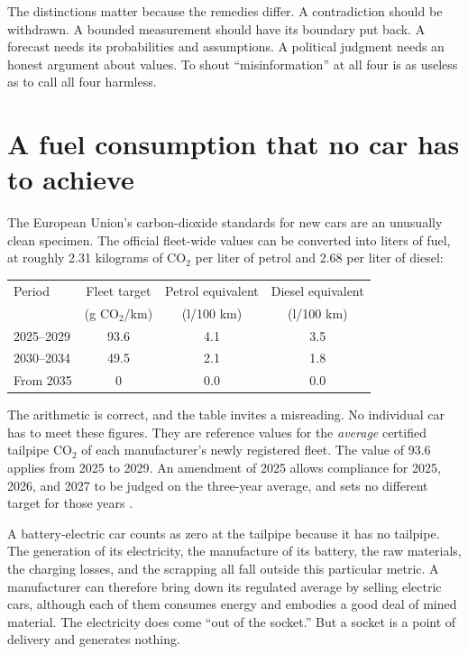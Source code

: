 \documentclass[12pt,a4paper]{book}
\begin{document}
The distinctions matter because the remedies differ. A contradiction should be withdrawn. A bounded measurement should have its boundary put back. A forecast needs its probabilities and assumptions. A political judgment needs an honest argument about values. To shout ``misinformation'' at all four is as useless as to call all four harmless.

\section{A fuel consumption that no car has to achieve}

The European Union's carbon-dioxide standards for new cars are an unusually clean specimen. The official fleet-wide values can be converted into liters of fuel, at roughly 2.31 kilograms of CO$_2$ per liter of petrol and 2.68 per liter of diesel:

\begin{center}
\begin{tabular}{lccc}
\hline
Period & Fleet target & Petrol equivalent & Diesel equivalent \\
       & (g CO$_2$/km) & (l/100 km) & (l/100 km) \\
\hline
2025--2029 & 93.6 & 4.1 & 3.5 \\
2030--2034 & 49.5 & 2.1 & 1.8 \\
From 2035 & 0 & 0.0 & 0.0 \\
\hline
\end{tabular}
\end{center}

The arithmetic is correct, and the table invites a misreading. No individual car has to meet these figures. They are reference values for the \emph{average} certified tailpipe CO$_2$ of each manufacturer's newly registered fleet. The value of 93.6 applies from 2025 to 2029. An amendment of 2025 allows compliance for 2025, 2026, and 2027 to be judged on the three-year average, and sets no different target for those years \cite{EUCarCO2Standards,EUCarFlexibility2025}.

A battery-electric car counts as zero at the tailpipe because it has no tailpipe. The generation of its electricity, the manufacture of its battery, the raw materials, the charging losses, and the scrapping all fall outside this particular metric. A manufacturer can therefore bring down its regulated average by selling electric cars, although each of them consumes energy and embodies a good deal of mined material. The electricity does come ``out of the socket.'' But a socket is a point of delivery and generates nothing.
\end{document}
